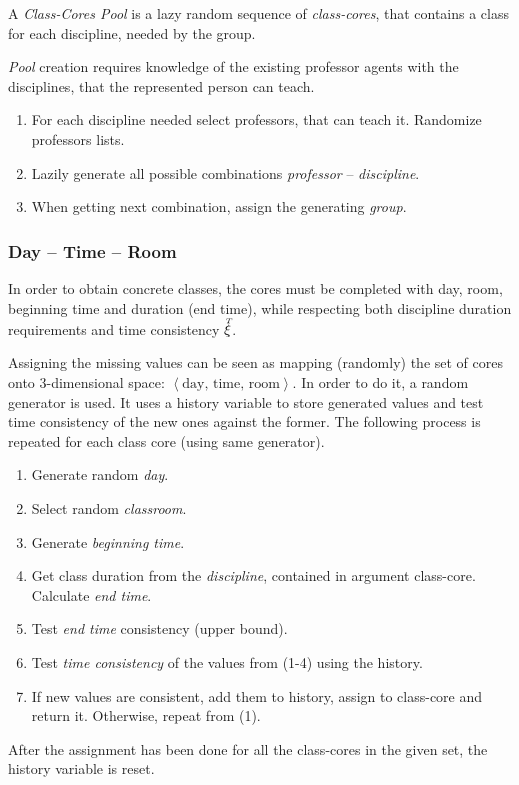 \documentclass[../../ThesisDoc]{subfiles}
\begin{document}
A \emph{Class-Cores Pool} is a lazy random sequence of \emph{class-cores},
that contains a class for each discipline, needed by the group.

\emph{Pool} creation requires knowledge of the existing professor agents with
the disciplines, that the represented person can teach.
\begin{enumerate}
  \item For each discipline needed select professors, that can teach it.
        Randomize professors lists.
  \item Lazily generate all possible combinations \emph{professor} -- \emph{discipline}.
  \item When getting next combination, assign the generating \emph{group}.
\end{enumerate}

\subsubsection{Day -- Time -- Room}

In order to obtain concrete classes, the cores must be completed with day, room,
beginning time and duration (end time), while respecting both discipline duration
requirements and time consistency $\accentset{T}{\xi}$.

Assigning the missing values can be seen as mapping (randomly) the set of cores onto
3-dimensional space: $\left< \text{day, time, room} \right>$.
In order to do it, a random generator is used. It uses a history variable to
store generated values and test time consistency of the new ones against the former.
The following process is repeated for each class core (using same generator).
\begin{enumerate}
  \item Generate random \emph{day}.
  \item Select random \emph{classroom}.
  \item Generate \emph{beginning time}.
  \item Get class duration from the \emph{discipline}, contained in argument class-core.
        Calculate \emph{end time}.
  \item Test \emph{end time} consistency (upper bound).
  \item Test \emph{time consistency} of the values from (1-4) using the history.
  \item If new values are consistent, add them to history, assign to class-core
        and return it.
        Otherwise, repeat from (1).

\end{enumerate}
After the assignment has been done for all the class-cores in the given set,
the history variable is reset.
\end{document}
